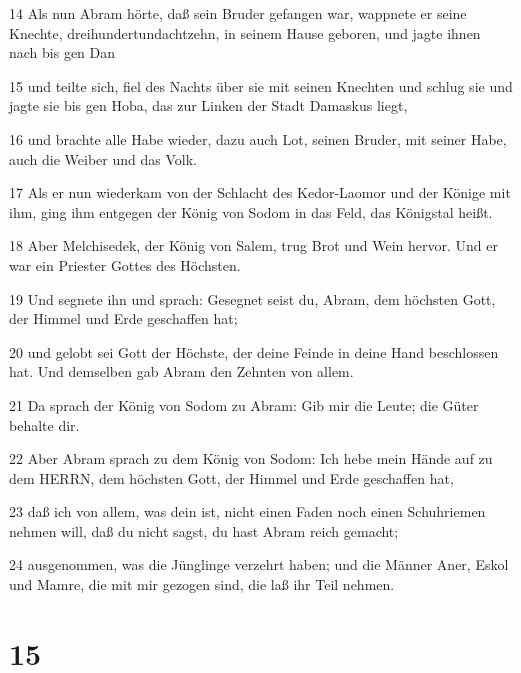 \par 14 Als nun Abram hörte, daß sein Bruder gefangen war, wappnete er seine Knechte, dreihundertundachtzehn, in seinem Hause geboren, und jagte ihnen nach bis gen Dan
\par 15 und teilte sich, fiel des Nachts über sie mit seinen Knechten und schlug sie und jagte sie bis gen Hoba, das zur Linken der Stadt Damaskus liegt,
\par 16 und brachte alle Habe wieder, dazu auch Lot, seinen Bruder, mit seiner Habe, auch die Weiber und das Volk.
\par 17 Als er nun wiederkam von der Schlacht des Kedor-Laomor und der Könige mit ihm, ging ihm entgegen der König von Sodom in das Feld, das Königstal heißt.
\par 18 Aber Melchisedek, der König von Salem, trug Brot und Wein hervor. Und er war ein Priester Gottes des Höchsten.
\par 19 Und segnete ihn und sprach: Gesegnet seist du, Abram, dem höchsten Gott, der Himmel und Erde geschaffen hat;
\par 20 und gelobt sei Gott der Höchste, der deine Feinde in deine Hand beschlossen hat. Und demselben gab Abram den Zehnten von allem.
\par 21 Da sprach der König von Sodom zu Abram: Gib mir die Leute; die Güter behalte dir.
\par 22 Aber Abram sprach zu dem König von Sodom: Ich hebe mein Hände auf zu dem HERRN, dem höchsten Gott, der Himmel und Erde geschaffen hat,
\par 23 daß ich von allem, was dein ist, nicht einen Faden noch einen Schuhriemen nehmen will, daß du nicht sagst, du hast Abram reich gemacht;
\par 24 ausgenommen, was die Jünglinge verzehrt haben; und die Männer Aner, Eskol und Mamre, die mit mir gezogen sind, die laß ihr Teil nehmen.

\chapter{15}

